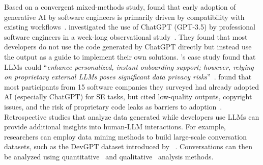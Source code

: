 \documentclass[smallextended]{svjour3}
\newcommand*{\enq}[1]{\enquote{{\itshape#1}}}
\begin{document}
Based on a convergent mixed-methods study, \citeauthor{DBLP:journals/tosem/Russo24} found that early adoption of generative AI by software engineers is primarily driven by compatibility with existing workflows~\cite{DBLP:journals/tosem/Russo24}.
\citeauthor{DBLP:journals/pacmse/KhojahM0N24} investigated the use of ChatGPT (GPT-3.5) by professional software engineers in a week-long observational study~\cite{DBLP:journals/pacmse/KhojahM0N24}.
They found that most developers do not use the code generated by ChatGPT directly but instead use the output as a guide to implement their own solutions.
\citeauthor{DBLP:conf/csee/AzanzaPIG24}'s case study found that LLMs could \enq{enhance personalized, instant onboarding support; however, relying on proprietary external LLMs poses significant data privacy risks}~\cite{DBLP:conf/csee/AzanzaPIG24}. 
 \citeauthor{DBLP:conf/icsa/JahicS24} found that most participants from 15 software companies they surveyed had already adopted AI (especially ChatGPT) for SE tasks, but cited low-quality outputs, copyright issues, and the risk of proprietary code leaks as barriers to adoption~\cite{DBLP:conf/icsa/JahicS24}. 
Retrospective studies that analyze data generated while developers use LLMs can provide additional insights into human-LLM interactions.
For example, researchers can employ data mining methods to build large-scale conversation datasets, such as the DevGPT dataset introduced by \citeauthor{DBLP:conf/msr/XiaoTHM24}~\cite{DBLP:conf/msr/XiaoTHM24}.
Conversations can then be analyzed using quantitative~\cite{DBLP:conf/msr/RabbiCZI24} and qualitative~\cite{DBLP:conf/msr/MohamedPP24} analysis methods.
\space%
\end{document}
